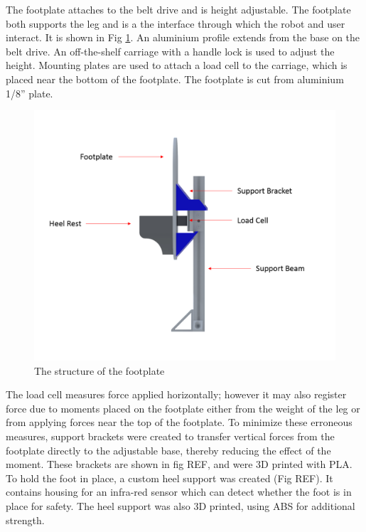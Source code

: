 \documentclass[12pt]{report}
\begin{document}
	The footplate attaches to the belt drive and is height adjustable. The footplate both supports the leg and is a the interface through which the robot and user interact. It is shown in Fig \ref{fig:footplate_label}. An aluminium profile extends from the base on the belt drive. An off-the-shelf carriage with a handle lock is used to adjust the height. Mounting plates are used to attach a load cell to the carriage, which is placed near the bottom of the footplate. The footplate is cut from aluminium 1/8'' plate. 
	

	
	\begin{figure}[h] 
		\centering
		\includegraphics[width=\linewidth]{footplate_label}
		\caption{The structure of the footplate}
		\label{fig:footplate_label}
	\end{figure}
	

	The load cell measures force applied horizontally; however it may also register force due to moments placed on the footplate either from the weight of the leg or from applying forces near the top of the footplate. To minimize these erroneous measures, support brackets were created to transfer vertical forces from the footplate directly to the adjustable base, thereby reducing the effect of the moment. These brackets are shown in fig REF, and were 3D printed with PLA. To hold the foot in place, a custom heel support was created (Fig REF). It contains housing for an infra-red sensor which can detect whether the foot is in place for safety. The heel support was also 3D printed, using ABS for additional strength. 
	
\end{document}
